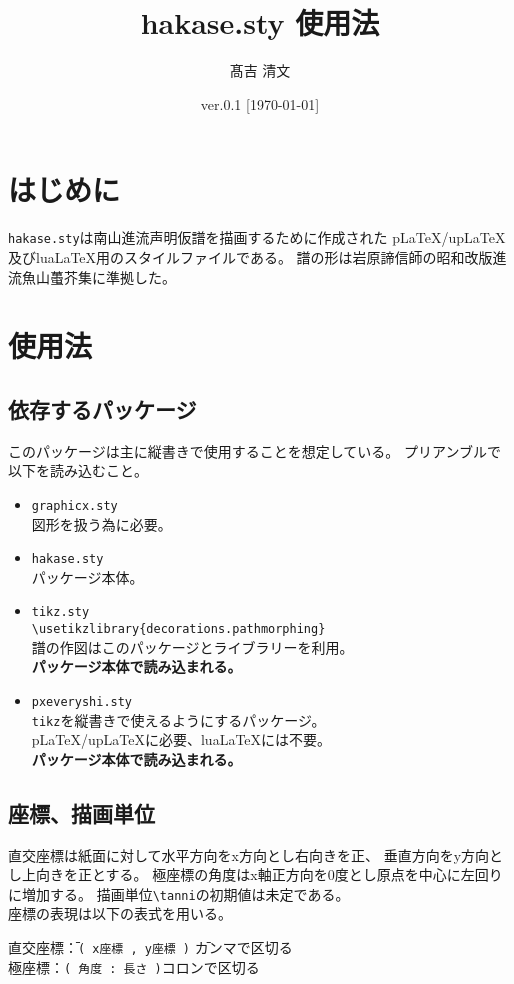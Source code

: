 \documentclass[a4paper,luatex]{l3doc}
\title{hakase.sty 使用法}
\author{髙吉 清文}
\date{ver.0.1 [\today]}
\begin{document}
\maketitle
\section{はじめに}
\verb|hakase.sty|は南山進流声明仮譜を描画するために作成された
p\LaTeX/up\LaTeX 及びlua\LaTeX 用のスタイルファイルである。
譜の形は岩原諦信師の昭和改版進流魚山蠆芥集に準拠した。
\section{使用法}
\subsection{依存するパッケージ}
このパッケージは主に縦書きで使用することを想定している。
プリアンブルで以下を読み込むこと。
\begin{itemize}
 \item \verb|graphicx.sty|\\
       図形を扱う為に必要。
 \item \verb|hakase.sty|\\
       パッケージ本体。
 \item \verb|tikz.sty|\\
       \verb|\usetikzlibrary{decorations.pathmorphing}|\\
       譜の作図はこのパッケージとライブラリーを利用。\\
       \textbf{パッケージ本体で読み込まれる。}
 \item \verb|pxeveryshi.sty|\\
       \verb|tikz|を縦書きで使えるようにするパッケージ。\\
       p\LaTeX/up\LaTeX に必要、lua\LaTeX には不要。\\
       \textbf{パッケージ本体で読み込まれる。}
\end{itemize}
\subsection{座標、描画単位}
直交座標は紙面に対して水平方向をx方向とし右向きを正、
垂直方向をy方向とし上向きを正とする。
極座標の角度はx軸正方向を0度とし原点を中心に左回りに増加する。
描画単位\verb|\tanni|の初期値は未定である。\\
座標の表現は以下の表式を用いる。
\begin{tabbing}
直交座標\=：\=\verb|( x座標 , y座標 )|  \=カンマで区切る \\
極座標\>：\>\verb|( 角度 : 長さ )|\>コロンで区切る	
\end{tabbing}
\end{document}
